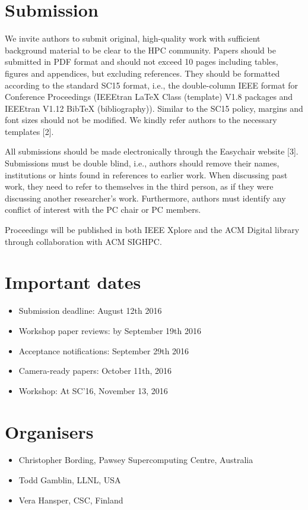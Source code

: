 \documentclass[11pt,a4paper]{article}
\begin{document}
\section{Submission}

We invite authors to submit original, high-quality work with
sufficient background material to be clear to the HPC
community. Papers should be submitted in PDF format and should not
exceed 10 pages including tables, figures and appendices, but
excluding references. They should be formatted according to the
standard SC15 format, i.e., the double-column IEEE format for
Conference Proceedings (IEEEtran LaTeX Class (template) V1.8 packages
and IEEEtran V1.12 BibTeX (bibliography)). Similar to the SC15 policy,
margins and font sizes should not be modified. We kindly refer authors
to the necessary templates [2].

All submissions should be made electronically through the Easychair
website [3].  Submissions must be double blind, i.e., authors should
remove their names, institutions or hints found in references to
earlier work. When discussing past work, they need to refer to
themselves in the third person, as if they were discussing another
researcher's work. Furthermore, authors must identify any conflict of
interest with the PC chair or PC members.

Proceedings will be published in both IEEE Xplore and the ACM Digital
library through collaboration with ACM SIGHPC.

\section{Important dates}
\begin{itemize}
\item Submission deadline: August 12th 2016
\item Workshop paper reviews: by September 19th 2016
\item Acceptance notifications: September 29th 2016
\item Camera-ready papers: October 11th, 2016
\item Workshop: At SC'16, November 13, 2016
\end{itemize}

\section{Organisers}

\begin{itemize}
\item Christopher Bording, Pawsey Supercomputing Centre, Australia
\item Todd Gamblin, LLNL, USA
\item Vera Hansper, CSC, Finland
\end{itemize}
\end{document}
